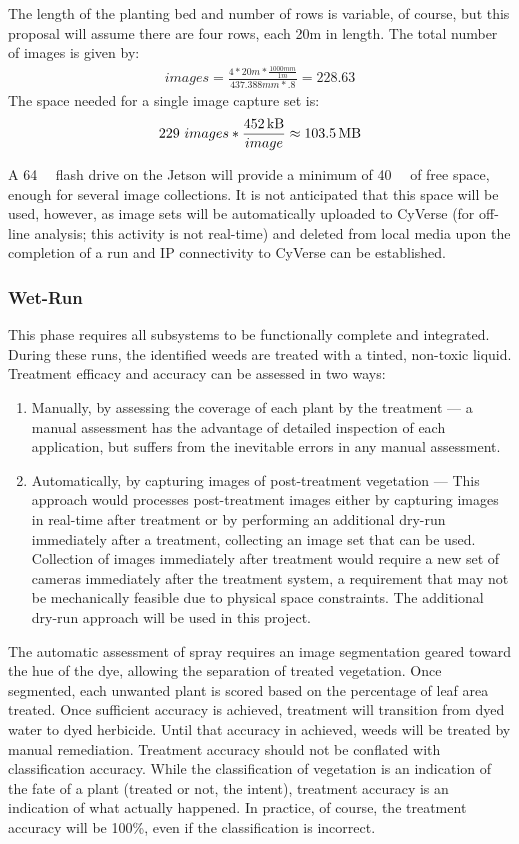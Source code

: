 \documentclass[12pt]{article}
\begin{document}
The length of the planting bed and number of rows is variable, of course, but this proposal will assume there are four rows, each 20m in length. The total number of images is given by:
\begin{align}
	images = \frac {4 * 20m * \frac{1000mm} {1m}} {437.388mm * .8} = 228.63
\end{align}
The space needed for a single image capture set is:
\begin{align}
229\ images * \frac{\SI{452}{\kilo\byte}} {image} \approx \SI{103.5}{\mega\byte}
\end{align}

A \SI{64}{\giga\byte} flash drive on the Jetson will provide a minimum of \SI{40}{\giga\byte} of free space, enough for several image collections. It is not anticipated that this space will be used, however, as image sets will be automatically uploaded to CyVerse (for off-line analysis; this activity is not real-time) and deleted from local media upon the completion of a run and IP connectivity to CyVerse can be established.

\subsubsection{Wet-Run} 
This phase requires all subsystems to be functionally complete and integrated. During these runs, the identified weeds are treated with a tinted, non-toxic liquid.  Treatment efficacy and accuracy can be assessed in two ways:
\begin{enumerate}
	\item{Manually, by assessing the coverage of each plant by the treatment --- a manual assessment has the advantage of detailed inspection of each application, but suffers from the inevitable errors in any manual assessment.}
	\item{Automatically, by capturing images of post-treatment vegetation --- This approach would processes post-treatment images either by capturing images in real-time after treatment or by performing an additional dry-run immediately after a treatment, collecting an image set that can be used.  Collection of images immediately after treatment would require a new set of cameras immediately after the treatment system, a requirement that may not be mechanically feasible due to physical space constraints. The additional dry-run approach will be used in this project.}
\end{enumerate}
The automatic assessment of spray requires an image segmentation geared toward the hue of the dye, allowing the separation of treated vegetation. Once segmented, each unwanted plant is scored based on the percentage of leaf area treated. Once sufficient accuracy is achieved, treatment will transition from dyed water to dyed herbicide. Until that accuracy in achieved, weeds will be treated by manual remediation. Treatment accuracy should not be conflated with classification accuracy. While the classification of vegetation is an indication of the fate of a plant (treated or not, the intent), treatment accuracy is an indication of what actually happened. In practice, of course, the treatment accuracy will be 100\%, even if the classification is incorrect.
\end{document}
